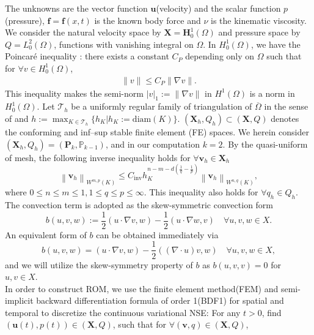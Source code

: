 \documentclass[10pt,twoside,openany,UTF8,CJK]{article}
\begin{document}
    The unknowns are the vector function $\boldsymbol{u}$(velocity) and the scalar function $p$(pressure), $\boldsymbol{f}=\boldsymbol{f}(x,t)$ is the known body force and $\nu$ is the kinematic viscosity.  \\
    \indent We consider the natural velocity space by $\boldsymbol{X} = \boldsymbol{H}^1_0(\Omega)$ and pressure space by $Q = L^2_0(\Omega)$, functions with vanishing integral on $\Omega$. In $H^1_0(\Omega)$, we have the Poincaré inequality \cite[p.135]{Brenner2008}: there exists a constant $C_{P}$ depending only on $\Omega$ such that for $\forall v\in H^1_0(\Omega)$,
    \begin{equation}\label{PoinIneq}
    	\begin{aligned}
    		    \|v\| \leq C_P\|\nabla v\|.
        \end{aligned}
    \end{equation}
    This inequality makes the semi-norm $|v|_1 := \|\nabla v\|$ in $H^1(\Omega)$ is a norm in $H^1_0(\Omega)$. Let ${\mathcal{T}_h}$ be a uniformly regular family of triangulation of $\overline{\Omega}$ in the sense of \cite[p.111]{Ciarlet-FEM-2002} and $h := \max_{K\in \mathcal{T}_h}\{h_K | h_K := \text{diam}(K)\}$. $(\boldsymbol{X}_h, Q_h) \subset (\boldsymbol{X}, Q)$ denotes the conforming and inf–sup stable finite element (FE) spaces. We herein consider $(\boldsymbol{X}_h, Q_h) = (\mathbb{\boldsymbol{P}}_k, \mathbb{P}_{k-1})$, and in our computation $k=2$. By the quasi-uniform of mesh, the following inverse inequality holds for $\forall \boldsymbol{v}_h\in \boldsymbol{X}_h$
    \begin{equation}\label{InveIneq}
    	\left\|\boldsymbol{v}_h\right\|_{W^{m, p}(K)} \leq C_{\mathrm{inv}} h_K^{n-m-d\left(\frac{1}{q}-\frac{1}{p}\right)}\left\|\boldsymbol{v}_h\right\|_{W^{n, q}(K)},
    \end{equation}
    where $0 \leq  n \leq  m \leq  1, 1 \leq  q \leq  p \leq  \infty $. This inequality also holds for $\forall q_h \in Q_h$. The convection term is adopted as the skew-symmetric convection form
    $$
    b(u, v, w) := \frac{1}{2}(u \cdot \nabla v, w) - \frac{1}{2}(u \cdot \nabla w, v) \quad \forall u, v, w \in X.
    $$
    An equivalent form of $b$ can be obtained immediately via
    $$
    b(u, v, w) = (u \cdot \nabla v, w) - \frac{1}{2}((\nabla\cdot u)  v, w) \quad \forall u, v, w \in X,
    $$
    and we will utilize the skew-symmetry property of $b$ as $b(u, v, v) = 0$ for $u,v\in X$. \\
	\indent In order to construct ROM, we use the finite element method(FEM) and semi-implicit backward differentiation formula of order 1(BDF1) for spatial and temporal to discretize the continuous variational NSE: For any $t > 0$, find $(\boldsymbol{u}(t),p(t)) \in (\boldsymbol{X},Q)$, such that for $\forall (\boldsymbol{v},q) \in (\boldsymbol{X},Q)$,
\end{document}
